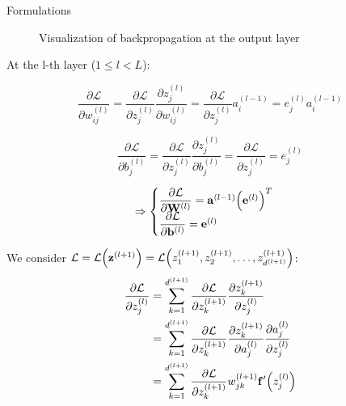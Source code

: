 \documentclass[10pt]{beamer}
\theoremstyle{remark}
\theoremstyle{definition}
\begin{document}
\begin{frame}[allowframebreaks]{Formulations}
\begin{figure}
{
		}
		\caption{Visualization of backpropagation at the output layer}
	\end{figure}

	At the l-th layer ($1 \leq l < L$):

	\begin{equation}
		\dfrac{\partial \mathcal{L}}{\partial w_{ij}^{(l)}}=\dfrac{\partial \mathcal{L}}{\partial z_j^{(l)}}\dfrac{\partial z_j^{(l)}}{\partial w_{ij}^{(l)}}=\dfrac{\partial \mathcal{L}}{\partial z_j^{(l)}} a_i^{(l-1)}=e_j^{(l)}a_i^{(l-1)}
	\end{equation}

	\begin{equation}
		\dfrac{\partial \mathcal{L}}{\partial b_j^{(l)}}=\dfrac{\partial \mathcal{L}}{\partial z_j^{(l)}}\dfrac{\partial z_j^{(l)}}{\partial b_j^{(l)}}=\dfrac{\partial \mathcal{L}}{\partial z_j^{(l)}} = e_j^{(l)}
	\end{equation}

	\begin{equation}
		\Rightarrow \begin{cases} \dfrac{\partial \mathcal{L}}{\partial \bold{W}^{(l)}}=\bold{a}^{(l-1)}\Big(\bold{e}^{(l)}\Big)^T \\ \dfrac{\partial \mathcal{L}}{\partial \bold{b}^{(l)}}=\bold{e}^{(l)} \end{cases}
	\end{equation}

	We consider $\mathcal{L} = \mathcal{L}\Big(\bold{z}^{(l+1)}\Big)=\mathcal{L}\Big(z_1^{(l+1)}, z_2^{(l+1)}, \dots, z_{d^{(l+1)}}^{(l+1)}\Big)$:
	\begin{equation}
		\begin{aligned}
			\dfrac{\partial \mathcal{L}}{\partial z_j^{(l)}}&=\sum_{k=1}^{d^{(l+1)}}\dfrac{\partial \mathcal{L}}{\partial z_k^{(l+1)}} \dfrac{\partial z_k^{(l+1)}}{\partial z_j^{(l)}}\\&=\sum_{k=1}^{d^{(l+1)}} \dfrac{\partial \mathcal{L}}{\partial z_k^{(l+1)}} \dfrac{\partial z_k^{(l+1)}}{\partial a_j^{(l)}} \dfrac{\partial a_j^{(l)}}{\partial z_j^{(l)}}\\&=\sum_{k=1}^{d^{(l+1)}}\dfrac{\partial \mathcal{L}}{\partial z_k^{(l+1)}}w_{jk}^{(l+1)}\bold{f}^{\prime}\Big(z_j^{(l)}\Big)
		\end{aligned}
	\end{equation}


\end{frame}
\end{document}
